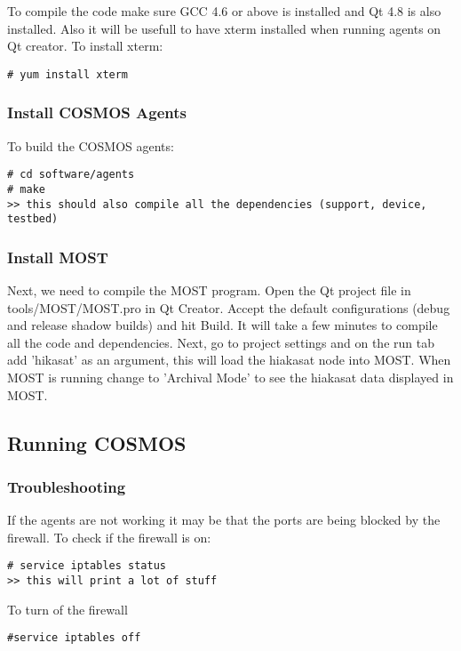 \documentclass{article}
\begin{document}
To compile the code make sure GCC 4.6 or above is installed and Qt 4.8 is also installed. Also it will be usefull to have xterm installed when running agents on Qt creator. To install xterm: \\
\begin{lstlisting}[style=BashInputStyle]
# yum install xterm
\end{lstlisting}

\subsubsection{Install COSMOS Agents}
To build the COSMOS agents:
\begin{lstlisting}[style=BashInputStyle]
# cd software/agents
# make
>> this should also compile all the dependencies (support, device, testbed)
\end{lstlisting}


\subsubsection{Install MOST}
Next, we need to compile the MOST program. Open the Qt project file in tools/MOST/MOST.pro in Qt Creator. Accept the default configurations (debug and release shadow builds) and hit Build. It will take a few minutes to compile all the code and dependencies. Next, go to project settings and on the run tab add 'hikasat' as an argument, this will load the hiakasat node into MOST. When MOST is running change to 'Archival Mode' to see the hiakasat data displayed in MOST. 


\subsection{Running COSMOS}


\subsubsection{Troubleshooting}
If the agents are not working it may be that the ports are being blocked by the firewall. To check if the firewall is on:
\begin{lstlisting}[style=BashInputStyle]
# service iptables status 
>> this will print a lot of stuff
\end{lstlisting}

To turn of the firewall 
\begin{lstlisting}[style=BashInputStyle]
#service iptables off
\end{lstlisting}
\end{document}

